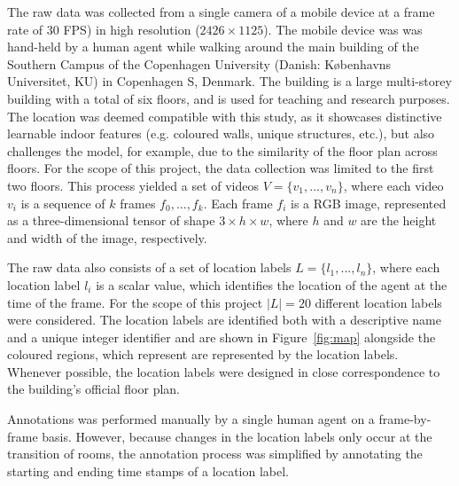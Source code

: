 \documentclass[a4paper]{article}
\begin{document}
  The raw data was collected from a single camera of a mobile device at a frame
  rate of 30 FPS) in high resolution ($2426\times 1125$). The mobile device was
  was hand-held by a human agent while walking around the main building of the
  Southern Campus of the Copenhagen University (Danish: K\o{}benhavns
  Universitet, KU) in Copenhagen S, Denmark. The building is a large
  multi-storey building with a total of six floors, and is used for teaching and
  research purposes. The location was deemed compatible with this study, as it
  showcases distinctive learnable indoor features (e.g. coloured walls, unique
  structures, etc.), but also challenges the model, for example, due to the
  similarity of the floor plan across floors. For the scope of this project, the
  data collection was limited to the first two floors. This process yielded a
  set of videos $V = \{v_1, ..., v_n\}$, where each video $v_i$ is a sequence of
  $k$ frames $f_0, ..., f_k$. Each frame $f_i$ is a RGB image, represented as a
  three-dimensional tensor of shape $3 \times h \times w$, where $h$ and $w$ are
  the height and width of the image, respectively. 

  The raw data also consists of a set of location labels $L = \{l_1, ...,
  l_n\}$, where each location label $l_i$ is a scalar value, which identifies
  the location of the agent at the time of the frame. For the scope of this
  project $|L|=20$ different location labels were considered. The location
  labels are identified both with a descriptive name and a unique integer
  identifier and are shown in Figure~\ref{fig:map} alongside the coloured
  regions, which represent are represented by the location labels. Whenever
  possible, the location labels were designed in close correspondence to the
  building's official floor plan.

  Annotations was performed manually by a single human agent on a frame-by-frame
  basis. However, because changes in the location labels only occur at the
  transition of rooms, the annotation process was simplified by annotating the
  starting and ending time stamps of a location label. 
\end{document}
